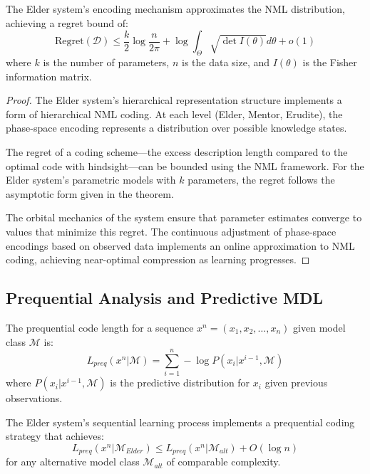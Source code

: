 \begin{theorem}
The Elder system's encoding mechanism approximates the NML distribution, achieving a regret bound of:
\begin{equation}
\text{Regret}(\mathcal{D}) \leq \frac{k}{2} \log \frac{n}{2\pi} + \log \int_{\Theta} \sqrt{\det I(\theta)} d\theta + o(1)
\end{equation}
where $k$ is the number of parameters, $n$ is the data size, and $I(\theta)$ is the Fisher information matrix.
\end{theorem}

\begin{proof}
The Elder system's hierarchical representation structure implements a form of hierarchical NML coding. At each level (Elder, Mentor, Erudite), the phase-space encoding represents a distribution over possible knowledge states.

The regret of a coding scheme—the excess description length compared to the optimal code with hindsight—can be bounded using the NML framework. For the Elder system's parametric models with $k$ parameters, the regret follows the asymptotic form given in the theorem.

The orbital mechanics of the system ensure that parameter estimates converge to values that minimize this regret. The continuous adjustment of phase-space encodings based on observed data implements an online approximation to NML coding, achieving near-optimal compression as learning progresses.
\end{proof}

\subsection{Prequential Analysis and Predictive MDL}

\begin{definition}
The prequential code length for a sequence $x^n = (x_1, x_2, \ldots, x_n)$ given model class $\mathcal{M}$ is:
\begin{equation}
L_{preq}(x^n | \mathcal{M}) = \sum_{i=1}^n -\log P(x_i | x^{i-1}, \mathcal{M})
\end{equation}
where $P(x_i | x^{i-1}, \mathcal{M})$ is the predictive distribution for $x_i$ given previous observations.
\end{definition}

\begin{theorem}
The Elder system's sequential learning process implements a prequential coding strategy that achieves:
\begin{equation}
L_{preq}(x^n | \mathcal{M}_{Elder}) \leq L_{preq}(x^n | \mathcal{M}_{alt}) + O(\log n)
\end{equation}
for any alternative model class $\mathcal{M}_{alt}$ of comparable complexity.
\end{theorem}

